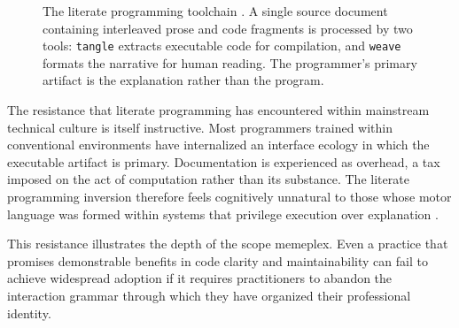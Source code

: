 \documentclass[12pt]{article}
\theoremstyle{definition}
\begin{document}
\begin{figure}[h]
\centering
{}
\caption{The literate programming toolchain \cite{knuth1984}. A single
source document containing interleaved prose and code fragments is
processed by two tools: \texttt{tangle} extracts executable code for
compilation, and \texttt{weave} formats the narrative for human reading.
The programmer's primary artifact is the explanation rather than the
program.}
\label{fig:literate}
\end{figure}

The resistance that literate programming has encountered within
mainstream technical culture is itself instructive. Most programmers
trained within conventional environments have internalized an interface
ecology in which the executable artifact is primary. Documentation is
experienced as overhead, a tax imposed on the act of computation rather
than its substance. The literate programming inversion therefore feels
cognitively unnatural to those whose motor language was formed within
systems that privilege execution over explanation \cite{brooks1975}.

This resistance illustrates the depth of the scope memeplex. Even a
practice that promises demonstrable benefits in code clarity and
maintainability can fail to achieve widespread adoption if it requires
practitioners to abandon the interaction grammar through which they have
organized their professional identity.
\end{document}
